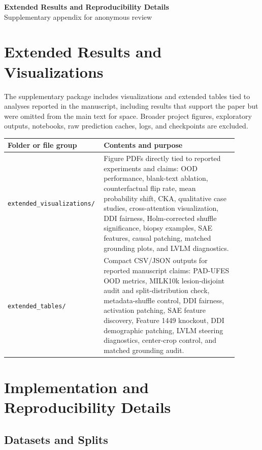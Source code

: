 \documentclass[10pt]{article}
\begin{document}
\begin{center}
{\Large\bfseries Extended Results and Reproducibility Details}\\
\vspace{2pt}
{\small Supplementary appendix for anonymous review}
\end{center}

\section*{Extended Results and Visualizations}

The supplementary package includes visualizations and extended tables tied to
analyses reported in the manuscript, including results that support the paper
but were omitted from the main text for space. Broader project figures,
exploratory outputs, notebooks, raw prediction caches, logs, and checkpoints
are excluded.

\begin{tabular}{>{\raggedright\arraybackslash}p{0.32\linewidth}>{\raggedright\arraybackslash}p{0.58\linewidth}}
\toprule
\textbf{Folder or file group} & \textbf{Contents and purpose} \\
\midrule
\texttt{extended\_visualizations/} & Figure PDFs directly tied to reported experiments and claims: OOD performance, blank-text ablation, counterfactual flip rate, mean probability shift, CKA, qualitative case studies, cross-attention visualization, DDI fairness, Holm-corrected shuffle significance, biopsy examples, SAE features, causal patching, matched grounding plots, and LVLM diagnostics. \\
\texttt{extended\_tables/} & Compact CSV/JSON outputs for reported manuscript claims: PAD-UFES OOD metrics, MILK10k lesion-disjoint audit and split-distribution check, metadata-shuffle control, DDI fairness, activation patching, SAE feature discovery, Feature 1449 knockout, DDI demographic patching, LVLM steering diagnostics, center-crop control, and matched grounding audit. \\
\bottomrule
\end{tabular}

\section*{Implementation and Reproducibility Details}

\subsection*{Datasets and Splits}
\end{document}
